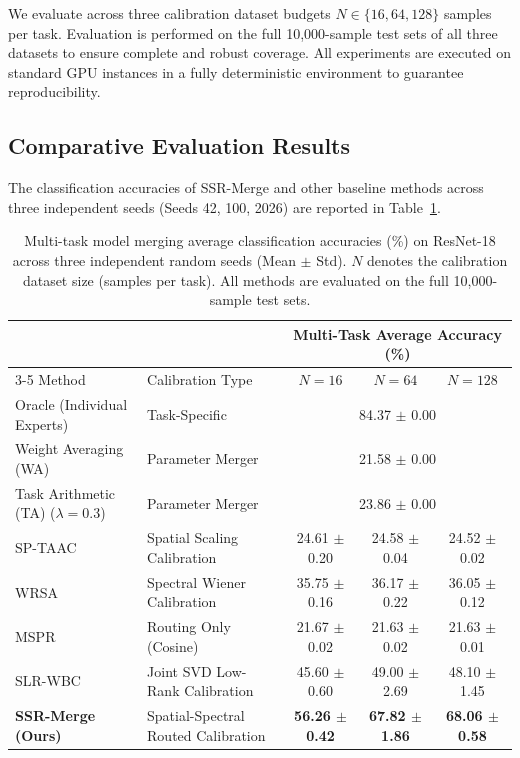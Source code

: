 \documentclass{article}
\theoremstyle{plain}
\theoremstyle{definition}
\theoremstyle{remark}
\begin{document}
We evaluate across three calibration dataset budgets $N \in \{16, 64, 128\}$ samples per task. Evaluation is performed on the full 10,000-sample test sets of all three datasets to ensure complete and robust coverage. All experiments are executed on standard GPU instances in a fully deterministic environment to guarantee reproducibility.

\subsection{Comparative Evaluation Results}
The classification accuracies of SSR-Merge and other baseline methods across three independent seeds (Seeds 42, 100, 2026) are reported in Table~\ref{tab:main_results}.

\begin{table}[t]
\caption{Multi-task model merging average classification accuracies (\%) on ResNet-18 across three independent random seeds (Mean $\pm$ Std). $N$ denotes the calibration dataset size (samples per task). All methods are evaluated on the full 10,000-sample test sets.}
\label{tab:main_results}
\vskip 0.15in
\begin{center}
\begin{small}
\begin{tabular}{llccc}
\toprule
& & \multicolumn{3}{c}{Multi-Task Average Accuracy (\%)} \\
\cmidrule{3-5}
Method & Calibration Type & $N = 16$ & $N = 64$ & $N = 128$ \\
\midrule
Oracle (Individual Experts) & Task-Specific & \multicolumn{3}{c}{84.37 $\pm$ 0.00} \\
Weight Averaging (WA) & Parameter Merger & \multicolumn{3}{c}{21.58 $\pm$ 0.00} \\
Task Arithmetic (TA) ($\lambda=0.3$) & Parameter Merger & \multicolumn{3}{c}{23.86 $\pm$ 0.00} \\
\midrule
SP-TAAC \cite{mspr2026} & Spatial Scaling Calibration & 24.61 $\pm$ 0.20 & 24.58 $\pm$ 0.04 & 24.52 $\pm$ 0.02 \\
WRSA \cite{wrsa2026} & Spectral Wiener Calibration & 35.75 $\pm$ 0.16 & 36.17 $\pm$ 0.22 & 36.05 $\pm$ 0.12 \\
MSPR \cite{mspr2026} & Routing Only (Cosine) & 21.67 $\pm$ 0.02 & 21.63 $\pm$ 0.02 & 21.63 $\pm$ 0.01 \\
SLR-WBC \cite{slrwbc2026} & Joint SVD Low-Rank Calibration & 45.60 $\pm$ 0.60 & 49.00 $\pm$ 2.69 & 48.10 $\pm$ 1.45 \\
\midrule
\textbf{SSR-Merge (Ours)} & Spatial-Spectral Routed Calibration & \textbf{56.26 $\pm$ 0.42} & \textbf{67.82 $\pm$ 1.86} & \textbf{68.06 $\pm$ 0.58} \\
\bottomrule
\end{tabular}
\end{small}
\end{center}
\vskip -0.1in
\end{table}
\end{document}
